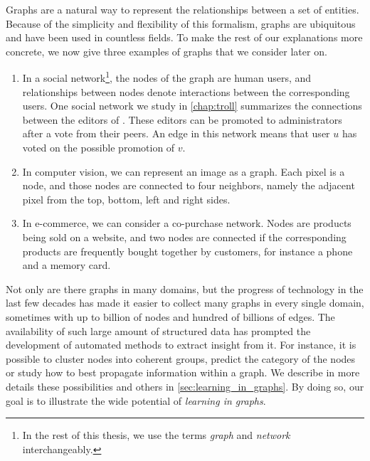 Graphs are a natural way to represent the relationships between a set of entities. Because of the
simplicity and flexibility of this formalism, graphs are ubiquitous and have been used in countless
fields. To make the rest of our explanations more concrete, we now give three examples of graphs
that we consider later on.
\begin{enumerate}[nosep]%
  \item In a social network\footnote{In the rest of this thesis, we use the terms \emph{graph} and
    \emph{network} interchangeably.}, the nodes of the graph are human users, and relationships
    between nodes denote interactions between the corresponding users. One social network we study
    in \autoref{chap:troll} summarizes the connections between the editors of \wik{}. These editors
    can be promoted to administrators after a vote from their peers. An edge \euv{} in this network
    means that user $u$ has voted on the possible promotion of $v$.
  \item In computer vision, we can represent an image as a graph. Each pixel is a node, and those
    nodes are connected to four neighbors, namely the adjacent pixel from the top, bottom, left and
    right sides.
  \item In e-commerce, we can consider a co-purchase network. Nodes are products being sold on a
    website, and two nodes are connected if the corresponding products are frequently bought
    together by customers, for instance a phone and a memory card.
\end{enumerate}

Not only are there graphs in many domains, but the progress of technology in the last few decades
has made it easier to collect many graphs in every single domain, sometimes with up to billion of
nodes and hundred of billions of edges. The availability of such large amount of structured data has
prompted the development of automated methods to extract insight from it. For instance, it is
possible to cluster nodes into coherent groups, predict the category of the nodes or study how to
best propagate information within a graph. We describe in more details these possibilities and
others in \autoref{sec:learning_in_graphs}. By doing so, our goal is to illustrate the wide
potential of \emph{learning in graphs}.


